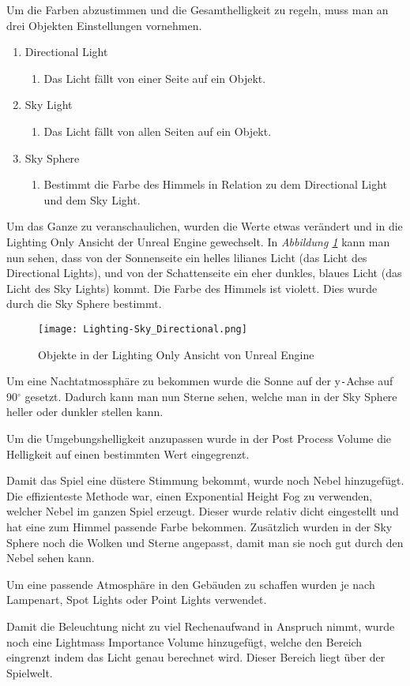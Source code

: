 Um die Farben abzustimmen und die Gesamthelligkeit zu regeln, muss man an drei Objekten Einstellungen vornehmen.
\begin{enumerate}
    \item Directional Light
    \begin{enumerate}
        \item Das Licht fällt von einer Seite auf ein Objekt.
    \end{enumerate}
    \item Sky Light
    \begin{enumerate}
        \item Das Licht fällt von allen Seiten auf ein Objekt.
    \end{enumerate}
    \item Sky Sphere
    \begin{enumerate}
        \item Bestimmt die Farbe des Himmels in Relation zu dem Directional Light und dem Sky Light.
    \end{enumerate}
\end{enumerate}

Um das Ganze zu veranschaulichen, wurden die Werte etwas verändert und in die Lighting Only Ansicht der Unreal Engine gewechselt.
In \textit{Abbildung \ref{lighting:Lighting-Sky_Directional}} kann man nun sehen,
dass von der Sonnenseite ein helles lilianes Licht (das Licht des Directional Lights), und von der Schattenseite ein eher dunkles, blaues Licht
(das Licht des Sky Lights) kommt.
Die Farbe des Himmels ist violett. Dies wurde durch die Sky Sphere bestimmt.
\begin{figure}[h]
    \centering
    \texttt{[image: Lighting-Sky\_Directional.png]}
    \caption{Objekte in der Lighting Only Ansicht von Unreal Engine}
    \label{lighting:Lighting-Sky_Directional}
\end{figure}

Um eine Nachtatmossphäre zu bekommen wurde die Sonne auf der y\verb+-+Achse auf 90$^\circ$ gesetzt. Dadurch kann man nun Sterne sehen,
welche man in der Sky Sphere heller oder dunkler stellen kann.

Um die Umgebungshelligkeit anzupassen wurde in der Post Process Volume die Helligkeit auf einen bestimmten Wert eingegrenzt.

Damit das Spiel eine düstere Stimmung bekommt, wurde noch Nebel hinzugefügt. Die effizienteste Methode war, einen Exponential Height Fog zu verwenden, welcher
Nebel im ganzen Spiel erzeugt. Dieser wurde relativ dicht eingestellt und hat eine zum Himmel passende Farbe bekommen. Zusätzlich wurden in der Sky Sphere noch die Wolken
und Sterne angepasst, damit man sie noch gut durch den Nebel sehen kann.

Um eine passende Atmosphäre in den Gebäuden zu schaffen wurden je nach Lampenart, Spot Lights oder Point Lights verwendet.

Damit die Beleuchtung nicht zu viel Rechenaufwand in Anspruch nimmt, wurde noch eine Lightmass Importance Volume hinzugefügt, welche den Bereich eingrenzt
indem das Licht genau berechnet wird. Dieser Bereich liegt über der Spielwelt.

